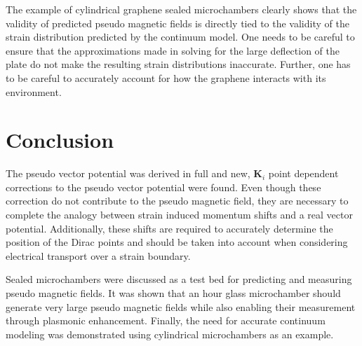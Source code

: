 The example of cylindrical graphene sealed microchambers clearly shows that the validity of predicted pseudo magnetic fields is directly tied to the validity of the strain distribution predicted by the continuum model.
One needs to be careful to ensure that the approximations made in solving for the large deflection of the plate do not make the resulting strain distributions inaccurate.
Further, one has to be careful to accurately account for how the graphene interacts with its environment.

\section{Conclusion}
The pseudo vector potential was derived in full and new, $\bm{K}_i$ point dependent corrections to the pseudo vector potential were found.
Even though these correction do not contribute to the pseudo magnetic field, they are necessary to complete the analogy between strain induced momentum shifts and a real vector potential.
Additionally, these shifts are required to accurately determine the position of the Dirac points and should be taken into account when considering electrical transport over a strain boundary.

Sealed microchambers were discussed as a test bed for predicting and measuring pseudo magnetic fields.
It was shown that an hour glass microchamber should generate very large pseudo magnetic fields while also enabling their measurement through plasmonic enhancement.
Finally, the need for accurate continuum modeling was demonstrated using cylindrical microchambers as an example.